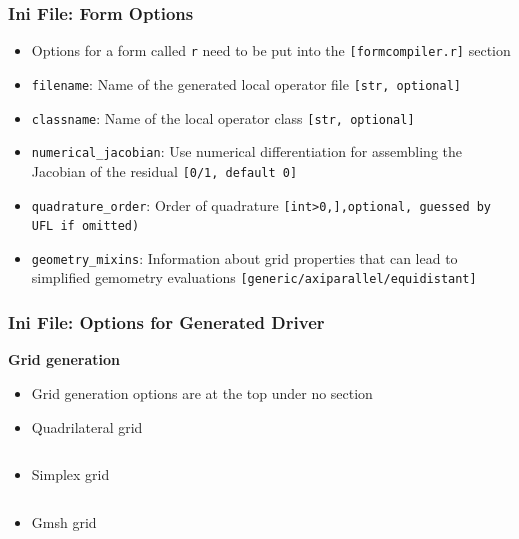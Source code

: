 \documentclass[ignorenonframetext,11pt]{beamer}
\theoremstyle{definition}
\begin{document}
\begin{frame}[fragile]
  \frametitle{Ini File: Form Options}

  \begin{itemize}
  \item Options for a form called \lstinline{r} need to be put into the
    \lstinline{[formcompiler.r]} section
  \item \lstinline{filename}: Name of the generated local
    operator file \lstinline{[str, optional]}
  \item \lstinline{classname}: Name of the local operator class
    \lstinline{[str, optional]}
  \item \lstinline{numerical_jacobian}: Use numerical differentiation for
    assembling the Jacobian of the residual \lstinline{[0/1, default 0]}
  \item \lstinline{quadrature_order}: Order of quadrature \lstinline{[int>0,],optional, guessed by UFL if omitted)}
  \item \lstinline{geometry_mixins}: Information about grid properties that can
    lead to simplified gemometry evaluations
    \lstinline{[generic/axiparallel/equidistant]}
  \end{itemize}
\end{frame}

\begin{frame}[fragile]
  \frametitle{Ini File: Options for Generated Driver}
  \textbf{Grid generation}


  \begin{itemize}
  \item Grid generation options are at the top under no section
  \item Quadrilateral grid
    \inputminted[fontsize=\tiny, firstline=1, lastline=2]{ini}{../src/heatequation.ini}
  \item Simplex grid
    \inputminted[fontsize=\tiny, firstline=1, lastline=4]{ini}{../src/poisson.ini}
  \item Gmsh grid
    \inputminted[fontsize=\tiny, firstline=1, lastline=1]{ini}{../exercise/task/navier_stokes.ini}

  \end{itemize}

\end{frame}
\end{document}
